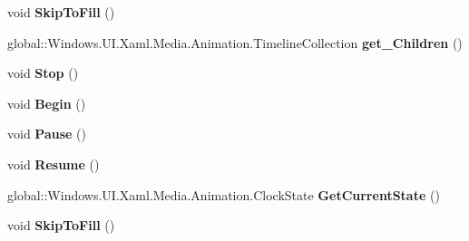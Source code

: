 \begin{DoxyCompactItemize}
void {\bfseries Skip\+To\+Fill} ()
\item 
\mbox{\label{interface_windows_1_1_u_i_1_1_xaml_1_1_media_1_1_animation_1_1_i_storyboard_a4d9df632c9aa2afcb3d619dcbb357776}} 
global\+::\+Windows.\+U\+I.\+Xaml.\+Media.\+Animation.\+Timeline\+Collection {\bfseries get\+\_\+\+Children} ()
\item 
\mbox{\label{interface_windows_1_1_u_i_1_1_xaml_1_1_media_1_1_animation_1_1_i_storyboard_acdc53aada6a43b3d82536e1968449961}} 
void {\bfseries Stop} ()
\item 
\mbox{\label{interface_windows_1_1_u_i_1_1_xaml_1_1_media_1_1_animation_1_1_i_storyboard_acecbf19b19efcd680ab801ea7583213d}} 
void {\bfseries Begin} ()
\item 
\mbox{\label{interface_windows_1_1_u_i_1_1_xaml_1_1_media_1_1_animation_1_1_i_storyboard_ab6962da9d22e4e6074b1b55d16e501c6}} 
void {\bfseries Pause} ()
\item 
\mbox{\label{interface_windows_1_1_u_i_1_1_xaml_1_1_media_1_1_animation_1_1_i_storyboard_ac730df45ba536de8f998a9a99c6995d6}} 
void {\bfseries Resume} ()
\item 
\mbox{\label{interface_windows_1_1_u_i_1_1_xaml_1_1_media_1_1_animation_1_1_i_storyboard_a921af38756f68389523f29696421dc20}} 
global\+::\+Windows.\+U\+I.\+Xaml.\+Media.\+Animation.\+Clock\+State {\bfseries Get\+Current\+State} ()
\item 
\mbox{\label{interface_windows_1_1_u_i_1_1_xaml_1_1_media_1_1_animation_1_1_i_storyboard_a2e94db3f45b7a46b539a78a132a85d7e}} 
void {\bfseries Skip\+To\+Fill} ()
\item 
\mbox{\label{interface_windows_1_1_u_i_1_1_xaml_1_1_media_1_1_animation_1_1_i_storyboard_a4d9df632c9aa2afcb3d619dcbb357776}} 

\end{DoxyCompactItemize}
